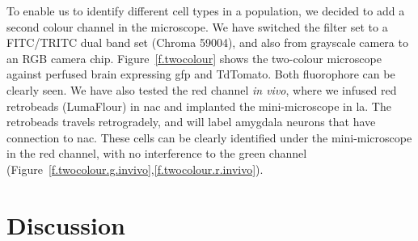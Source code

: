 To enable us to identify different cell types in a population, we decided to add a second colour channel in the microscope. We have switched the filter set to a FITC/TRITC dual band set (Chroma 59004), and also from grayscale camera to an RGB camera chip. Figure~\ref{f.twocolour} shows the two-colour microscope against perfused brain expressing \gls{gfp} and TdTomato. Both fluorophore can be clearly seen. We have also tested the red channel \textit{in vivo}, where we infused red retrobeads (LumaFlour) in \gls{nac} and implanted the mini-microscope in \gls{la}. The retrobeads travels retrogradely, and will label amygdala neurons that have connection to \gls{nac}. These cells can be clearly identified under the mini-microscope in the red channel, with no interference to the green channel (Figure~\ref{f.twocolour.g.invivo},\ref{f.twocolour.r.invivo}). 

\section{Discussion}
